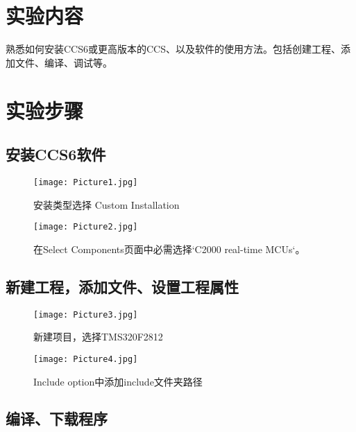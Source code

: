 \documentclass{math201}
\begin{document}

\makecover


\section{实验内容}

熟悉如何安装CCS6或更高版本的CCS、以及软件的使用方法。包括创建工程、添加文件、编译、调试等。

\section{实验步骤}

\subsection{安装CCS6软件}

\begin{figure}[H]  
    \centering\texttt{[image: Picture1.jpg]}  
    \caption{安装类型选择 Custom Installation}
\end{figure}

\begin{figure}[H]  
  \centering\texttt{[image: Picture2.jpg]}  
  \caption{在Select Components页面中必需选择`C2000 real-time MCUs`。}     
\end{figure}

\subsection{新建工程，添加文件、设置工程属性}

\begin{figure}[H]  
  \centering\texttt{[image: Picture3.jpg]}  
  \caption{新建项目，选择TMS320F2812}     
\end{figure}

\begin{figure}[H]  
  \centering\texttt{[image: Picture4.jpg]}  
  \caption{Include option中添加include文件夹路径}     
\end{figure}

\subsection{编译、下载程序}
\end{document}
